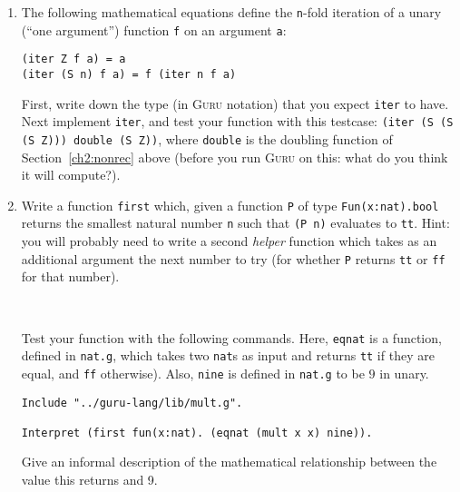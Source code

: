 \documentclass{book}[12pt]
\newcommand{\guru}[0]{\textsc{Guru}\xspace}
\begin{document}
\begin{enumerate}
\begin{verbatim}
(f Z Z) = ff
(f (S x) Z) = tt
(f Z (S y)) = tt
(f (S x) (S y)) = (f x y)
\end{verbatim}

\noindent Define a function (in \guru) to implement these mathematical
equations.  Hint: because the equations analyze each argument, you will
need to use nested pattern matching.  Match first on one argument, and
then in each resulting \texttt{match}-clause, match on the other.  Test
your function on 2 and 3.

\item The following mathematical equations define the
\texttt{n}-fold iteration of a unary (``one argument'') function
\texttt{f} on an argument \texttt{a}:

\begin{verbatim}
(iter Z f a) = a
(iter (S n) f a) = f (iter n f a)
\end{verbatim}

\noindent First, write down the type (in \guru notation) that you
expect \texttt{iter} to have.  Next implement \texttt{iter}, and test
your function with this testcase: \texttt{(iter (S (S (S Z))) double
(S Z))}, where \texttt{double} is the doubling function of
Section~\ref{ch2:nonrec} above (before you run \guru on this: what
do you think it will compute?).

\item Write a function \texttt{first} which, given a function
\texttt{P} of type \texttt{Fun(x:nat).bool} returns the smallest
natural number \texttt{n} such that \texttt{(P n)} evaluates to
\texttt{tt}.  Hint: you will probably need to write a second
\emph{helper} function which takes as an additional argument the next
number to try (for whether \texttt{P} returns \texttt{tt} or
\texttt{ff} for that number).  

\ 

Test your function with the following commands.  Here, \texttt{eqnat}
is a function, defined in \texttt{nat.g}, which takes two
\texttt{nat}s as input and returns \texttt{tt} if they are equal, and
\texttt{ff} otherwise).  Also, \texttt{nine} is defined in
\texttt{nat.g} to be $9$ in unary.

\begin{verbatim}
Include "../guru-lang/lib/mult.g".

Interpret (first fun(x:nat). (eqnat (mult x x) nine)).
\end{verbatim}

\noindent Give an informal description of the mathematical
relationship between the value this returns and 9.

\end{enumerate}
\end{document}
